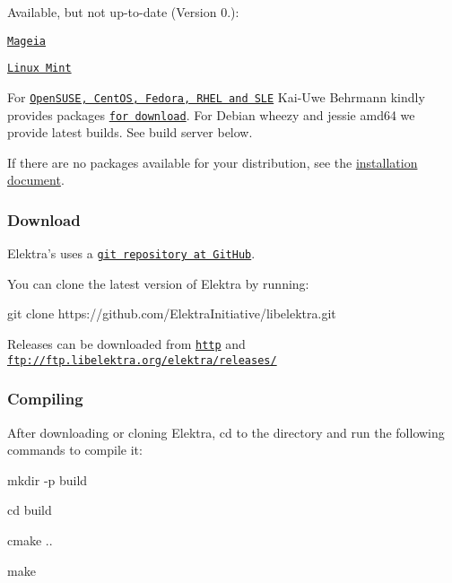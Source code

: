 Available, but not up-\/to-\/date (Version 0.)\+:
\begin{DoxyItemize}
\item \href{http://svnweb.mageia.org/packages/updates/1/elektra/}{\tt Mageia}
\item \href{http://community.linuxmint.com/software/view/elektra}{\tt Linux Mint}
\end{DoxyItemize}

For \href{https://build.opensuse.org/package/show/home:bekun:devel/elektra}{\tt Open\+S\+U\+S\+E, Cent\+O\+S, Fedora, R\+H\+E\+L and S\+L\+E} Kai-\/\+Uwe Behrmann kindly provides packages \href{http://software.opensuse.org/download.html?project=home%3Abekun%3Adevel&package=libelektra4}{\tt for download}. For Debian wheezy and jessie amd64 we provide latest builds. See build server below.

If there are no packages available for your distribution, see the \hyperlink{doc_INSTALL_md}{installation document}.

\subsubsection*{Download}

Elektra's uses a \href{https://github.com/ElektraInitiative/libelektra}{\tt git repository at Git\+Hub}.

You can clone the latest version of Elektra by running\+: \begin{DoxyVerb}     git clone https://github.com/ElektraInitiative/libelektra.git
\end{DoxyVerb}


Releases can be downloaded from \href{http://www.libelektra.org/ftp/elektra/releases/}{\tt http} and {\ttfamily \href{ftp://ftp.libelektra.org/elektra/releases/}{\tt ftp\+://ftp.\+libelektra.\+org/elektra/releases/}}

\subsubsection*{Compiling}

After downloading or cloning Elektra, {\ttfamily cd} to the directory and run the following commands to compile it\+:


\begin{DoxyItemize}
\item {\ttfamily mkdir -\/p build}
\item {\ttfamily cd build}
\item {\ttfamily cmake ..}
\item {\ttfamily make}
\end{DoxyItemize}

